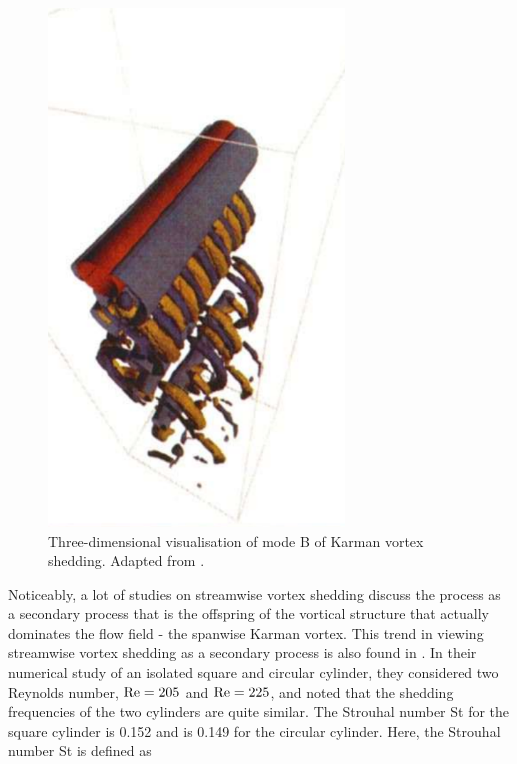 \documentclass[oneside]{utmthesis}
\begin{document}
\begin{figure}[!h]
  \centering
  \hspace{1cm} \includegraphics[angle=90,width=0.7\textwidth]{figs/modeB3D}
    \caption{Three-dimensional visualisation of mode B of Karman vortex shedding. Adapted from \citet{Thompson1994}.}
    \label{fig:modeB3D}
  \end{figure}


Noticeably, a lot of studies on streamwise vortex shedding discuss the process as a secondary process that is the offspring of the vortical structure that actually dominates the flow field - the spanwise Karman vortex. This trend in viewing streamwise vortex shedding as a secondary process is also found in \citet{Agbaglah2019}. In their numerical study of an isolated square and circular cylinder, they considered two Reynolds number, $\text{Re} = 205$ and $\text{Re} = 225$, and noted that the shedding frequencies of the two cylinders are quite similar. The Strouhal number St for the square cylinder is 0.152 and is 0.149 for the circular cylinder. Here, the Strouhal number St is defined as
\end{document}
